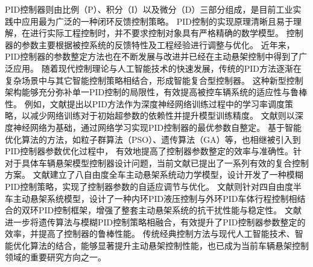 PID控制器则由比例（P）、积分（I）以及微分（D）三部分组成，是目前工业实践中应用最为广泛的一种闭环反馈控制策略。
PID控制的实现原理清晰且易于理解，在进行实际工程控制时，并不要求控制对象具有严格精确的数学模型。
控制器的参数主要根据被控系统的反馈特性及工程经验进行调整与优化。
近年来，PID控制器的参数整定方法也在不断发展与改进并已经在主动悬架控制中得到了广泛应用\cite{pidcontrollers,hanafi2010pid,YANG2011521}。
随着现代控制理论与人工智能技术的快速发展，传统的PID方法逐渐在复杂场景中与其它智能控制策略相结合，形成智能复合型控制器。
这种新型控制架构能够充分弥补单一PID控制的局限性，有效提高被控车辆系统的适应性与鲁棒性。
例如，文献提出以PID方法作为深度神经网络训练过程中的学习率调度策略，以减少网络训练对于初始超参数的依赖性并提升模型训练精度。
文献则以深度神经网络为基础，通过网络学习实现PID控制器的最优参数自整定。
基于智能优化算法的方法，如粒子群算法（PSO）\cite{pso_pid_tuning_cn}、遗传算法（GA）\cite{NRPJ202503013}等，也相继被引入到PID控制器参数优化过程中，
有效地提高了控制器参数整定的效率与准确性。针对于具体车辆悬架模型控制器设计问题，当前文献已提出了一系列有效的复合控制方案。
文献建立了八自由度全车主动悬架系统动力学模型，设计开发了一种模糊PID控制策略，实现了控制器参数的自适应调节与优化。
文献则针对四自由度半车主动悬架系统模型，设计了一种内环PID液压控制与外环PID车体行程控制相结合的双环PID控制框架，增强了整套主动悬架系统的抗干扰性能与稳定性。
文献进一步将遗传算法与模糊PID控制策略相融合，有效提升了PID控制器参数整定的效率，并提高了控制器的鲁棒性能。
传统经典控制方法与现代人工智能技术、智能优化算法的结合，能够显著提升主动悬架控制性能，也已成为当前车辆悬架控制领域的重要研究方向之一。


